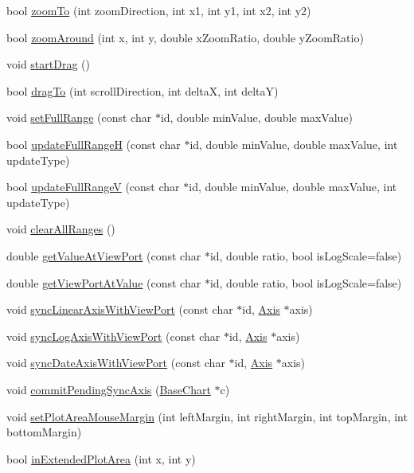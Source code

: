 \begin{DoxyCompactItemize}
\item 
bool \hyperlink{class_view_port_manager_a50b30e900b4ca55321fb6d8cac99e2ee}{zoom\+To} (int zoom\+Direction, int x1, int y1, int x2, int y2)
\item 
bool \hyperlink{class_view_port_manager_ae1be85f3a163f841202bdc260d04f8f3}{zoom\+Around} (int x, int y, double x\+Zoom\+Ratio, double y\+Zoom\+Ratio)
\item 
void \hyperlink{class_view_port_manager_a2bfc533d7b307723e29ef03c45fb3237}{start\+Drag} ()
\item 
bool \hyperlink{class_view_port_manager_aeea4d7130197f70eb7ab453316e79c77}{drag\+To} (int scroll\+Direction, int deltaX, int deltaY)
\item 
void \hyperlink{class_view_port_manager_accd91f779d15c0e92e1021a1954697d8}{set\+Full\+Range} (const char $\ast$id, double min\+Value, double max\+Value)
\item 
bool \hyperlink{class_view_port_manager_a007141f50fa8ae8ad2f80bd10c5f097f}{update\+Full\+RangeH} (const char $\ast$id, double min\+Value, double max\+Value, int update\+Type)
\item 
bool \hyperlink{class_view_port_manager_ac54ae9b215ca55fc30cfe5cbacfe0865}{update\+Full\+RangeV} (const char $\ast$id, double min\+Value, double max\+Value, int update\+Type)
\item 
void \hyperlink{class_view_port_manager_a8b23a571e322e8e61066b9e2172ca4ac}{clear\+All\+Ranges} ()
\item 
double \hyperlink{class_view_port_manager_a9109a8e0fa981a9443205641d59bb409}{get\+Value\+At\+View\+Port} (const char $\ast$id, double ratio, bool is\+Log\+Scale=false)
\item 
double \hyperlink{class_view_port_manager_a74886ad36dd990d09a70fc480cf9d7d7}{get\+View\+Port\+At\+Value} (const char $\ast$id, double ratio, bool is\+Log\+Scale=false)
\item 
void \hyperlink{class_view_port_manager_a0c127c218b1dabc082644d5cc95f256d}{sync\+Linear\+Axis\+With\+View\+Port} (const char $\ast$id, \hyperlink{class_axis}{Axis} $\ast$axis)
\item 
void \hyperlink{class_view_port_manager_a8b2c7545c83751250c1239ec1f4e566d}{sync\+Log\+Axis\+With\+View\+Port} (const char $\ast$id, \hyperlink{class_axis}{Axis} $\ast$axis)
\item 
void \hyperlink{class_view_port_manager_a7fe758aa316bfaee4bcbc9f28de8c3f0}{sync\+Date\+Axis\+With\+View\+Port} (const char $\ast$id, \hyperlink{class_axis}{Axis} $\ast$axis)
\item 
void \hyperlink{class_view_port_manager_a08f479a4daff50e8a76cf2c11b796d15}{commit\+Pending\+Sync\+Axis} (\hyperlink{class_base_chart}{Base\+Chart} $\ast$c)
\item 
void \hyperlink{class_view_port_manager_aa42a66b39276ed7707524cc8d901caef}{set\+Plot\+Area\+Mouse\+Margin} (int left\+Margin, int right\+Margin, int top\+Margin, int bottom\+Margin)
\item 
bool \hyperlink{class_view_port_manager_a11b9ed53c57b96be9ef663200b64be87}{in\+Extended\+Plot\+Area} (int x, int y)
\end{DoxyCompactItemize}



